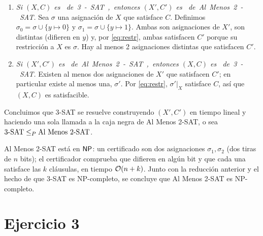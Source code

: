 \begin{enumerate}[label=(\roman*)]
  \item \emph{Si $(X,C)$ es \SI{} de 3-SAT, entonces $(X',C')$ es \SI{} de Al Menos 2-SAT.} Sea $\sigma$
  una asignación de $X$ que satisface $C$. Definimos $\sigma_0 = \sigma\cup\{y\mapsto 0\}$ y
  $\sigma_1=\sigma\cup\{y\mapsto 1\}$. Ambas son asignaciones de $X'$, son distintas (difieren en $y$) y, por
  \eqref{eq:restr}, ambas satisfacen $C'$ porque su restricción a $X$ es $\sigma$. Hay al menos 2
  asignaciones distintas que satisfacen $C'$.
  \item \emph{Si $(X',C')$ es \SI{} de Al Menos 2-SAT, entonces $(X,C)$ es \SI{} de 3-SAT.} Existen al menos
  dos asignaciones de $X'$ que satisfacen $C'$; en particular existe al menos una, $\sigma'$. Por
  \eqref{eq:restr}, $\sigma'|_X$ satisface $C$, así que $(X,C)$ es satisfacible.
\end{enumerate}

Concluimos que 3-SAT se resuelve construyendo $(X',C')$ en tiempo lineal y haciendo una sola llamada a la
caja negra de Al Menos 2-SAT, o sea $\text{3-SAT}\le_P\text{Al Menos 2-SAT}$.

\begin{observacion}
Al Menos 2-SAT está en $\mathsf{NP}$: un certificado son dos asignaciones $\sigma_1,\sigma_2$ (dos tiras de $n$
bits); el certificador comprueba que difieren en algún bit y que cada una satisface las $k$ cláusulas, en
tiempo $\mathcal{O}(n+k)$. Junto con la reducción anterior y el hecho de que 3-SAT es NP-completo, se concluye que
Al Menos 2-SAT es NP-completo.
\end{observacion}

\section{Ejercicio 3}

